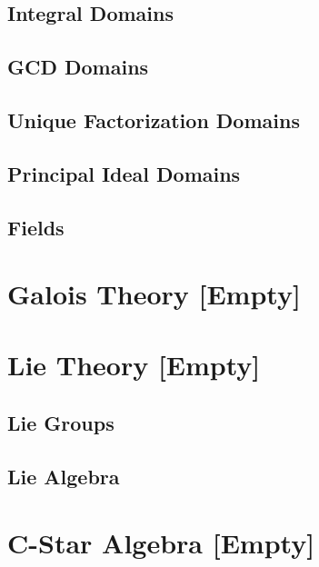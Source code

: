 \documentclass[12pt, english]{book}
\begin{document}
	\chapter{Integral Domains} \label{Integral Domains Chapter - Abstract Algebra}
	
	\chapter{GCD Domains} \label{GCD Domains Chapter - Abstract Algebra}
	
	\chapter{Unique Factorization Domains} \label{Unique Factorization Domains Chapter - Abstract Algebra}
	
	\chapter{Principal Ideal Domains} \label{Principal Ideal Domains Chapter - Abstract Algebra}
	
	\chapter{Fields} \label{Fields Chapter - Abstract Algebra}
	
	
	\part{Galois Theory [Empty]} \label{Galois Theory Part}
	
	\part{Lie Theory [Empty]} \label{Lie Algebra Part}
	
	\chapter{Lie Groups}
	
	\chapter{Lie Algebra}
	
	\part{C-Star Algebra [Empty]} \label{C-Star Algebra Part}
	
\end{document}
